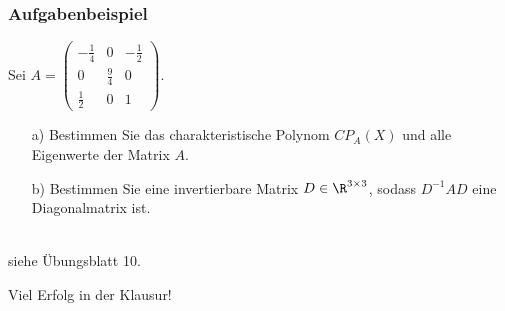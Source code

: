 %
%
\begin{frame}\frametitle{Aufgabenbeispiel}
Sei $A=\begin{pmatrix} -\frac{1}{4} & 0 & -\frac{1}{2} \\ 0 & \frac{9}{4} & 0 \\ \frac{1}{2} & 0 &1 \end{pmatrix}$. 
\begin{itemize}
\item[a)] Bestimmen Sie das charakteristische Polynom $CP_A(X)$ und alle Eigenwerte der Matrix $A$.
\item[b)] Bestimmen Sie eine invertierbare Matrix $D \in \R^{3 \times 3}$, sodass $D^{-1}AD$ eine Diagonalmatrix ist.
\end{itemize}
\vfill
{}\\
siehe Übungsblatt 10.
\end{frame}
%
%
%
\begin{frame}
\LARGE{Viel Erfolg in der Klausur!}
\end{frame}
%
%
